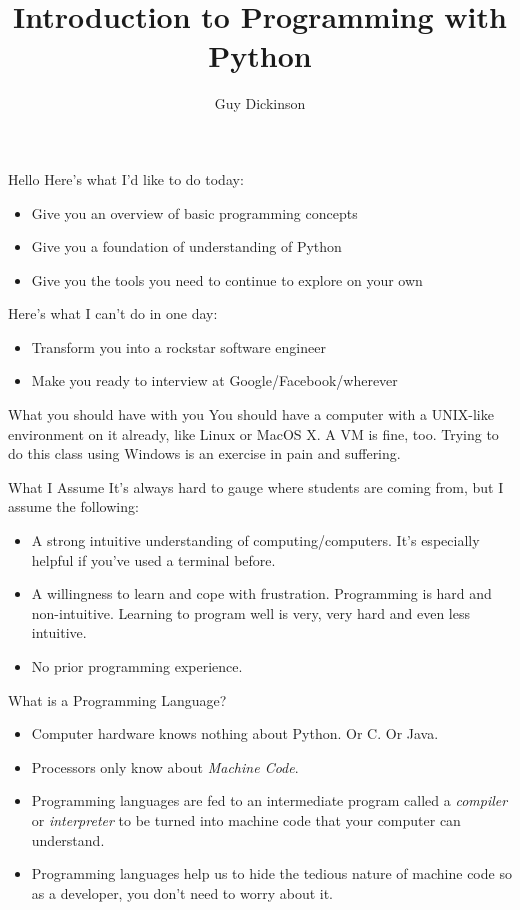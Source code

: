 \documentclass{beamer}
\title{Introduction to Programming with Python}
\author{Guy Dickinson}
\institute{NYC Resistor \\
\texttt{guy@gdickinson.co.uk} \\
\texttt{@gdickinson}}
\begin{document}
\begin{frame}
  \titlepage
\end{frame}

\begin{frame}{Hello}
  Here's what I'd like to do today:
  \begin{itemize}
    \item Give you an overview of basic programming concepts 
    \item Give you a foundation of understanding of Python
    \item Give you the tools you need to continue to explore on your own
  \end{itemize}
  Here's what I can't do in one day:
  \begin{itemize}
    \item Transform you into a rockstar software engineer
    \item Make you ready to interview at Google/Facebook/wherever
  \end{itemize}
\end{frame}

\begin{frame}{What you should have with you}
  You should have a computer with a UNIX-like environment on it already, like Linux or MacOS X. A VM is fine, too. Trying to do this class using Windows is an exercise in pain and suffering.
\end{frame}

\begin{frame}{What I Assume}
  It's always hard to gauge where students are coming from, but I assume the following:
  \begin{itemize}
    \item A strong intuitive understanding of computing/computers. It's especially helpful if you've used a terminal before.
    \item A willingness to learn and cope with frustration. Programming is hard and non-intuitive. Learning to program well is very, very hard and even less intuitive.
    \item No prior programming experience.
  \end{itemize}
  
\end{frame}

\begin{frame}{What is a Programming Language?}
  \begin{itemize}
    \item Computer hardware knows nothing about Python. Or C. Or Java.
    \item Processors only know about \emph{Machine Code}.
    \item Programming languages are fed to an intermediate program called a \emph{compiler} or \emph{interpreter}
    to be turned into machine code that your computer can understand.
    \item Programming languages help us to hide the tedious nature of machine code so as a developer, you don't need to worry about it.
  \end{itemize}
\end{frame}
\end{document}
